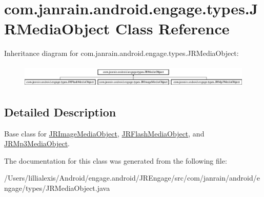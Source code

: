 \hypertarget{classcom_1_1janrain_1_1android_1_1engage_1_1types_1_1_j_r_media_object}{
\section{com.janrain.android.engage.types.JRMediaObject Class Reference}
\label{classcom_1_1janrain_1_1android_1_1engage_1_1types_1_1_j_r_media_object}
}
Inheritance diagram for com.janrain.android.engage.types.JRMediaObject:\begin{figure}[H]
\begin{center}
\leavevmode
\includegraphics[height=1.107814cm]{classcom_1_1janrain_1_1android_1_1engage_1_1types_1_1_j_r_media_object}
\end{center}
\end{figure}


\subsection{Detailed Description}
Base class for \hyperlink{classcom_1_1janrain_1_1android_1_1engage_1_1types_1_1_j_r_image_media_object}{JRImageMediaObject}, \hyperlink{classcom_1_1janrain_1_1android_1_1engage_1_1types_1_1_j_r_flash_media_object}{JRFlashMediaObject}, and \hyperlink{classcom_1_1janrain_1_1android_1_1engage_1_1types_1_1_j_r_mp3_media_object}{JRMp3MediaObject}. 

The documentation for this class was generated from the following file:\begin{DoxyCompactItemize}
\item 
/Users/lillialexis/Android/engage.android/JREngage/src/com/janrain/android/engage/types/JRMediaObject.java\end{DoxyCompactItemize}
